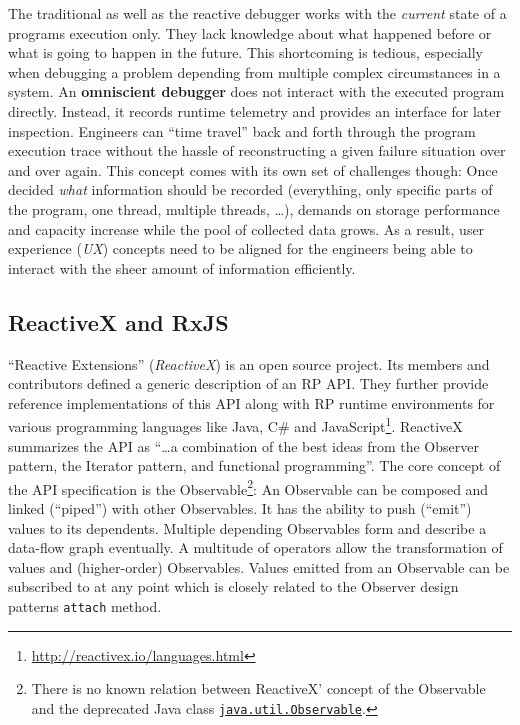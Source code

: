 \documentclass[12pt,a4paper]{article}
\begin{document}
The traditional as well as the reactive debugger works with the \emph{current} state of a programs execution only. They lack knowledge about what happened before or what is going to happen in the future. This shortcoming is tedious, especially when debugging a problem depending from multiple complex circumstances in a system. An \textbf{omniscient debugger} \cite{5287015} \cite{DBLP:journals/corr/OCallahanJFHNP17} does not interact with the executed program directly. Instead, it records runtime telemetry and provides an interface for later inspection. Engineers can ``time travel'' back and forth through the program execution trace without the hassle of reconstructing a given failure situation over and over again. This concept comes with its own set of challenges though: Once decided \emph{what} information should be recorded (everything, only specific parts of the program, one thread, multiple threads, \dots), demands on storage performance and capacity increase while the pool of collected data grows. As a result, user experience (\emph{UX}) concepts need to be aligned for the engineers being able to interact with the sheer amount\cite{5287015} of information efficiently.

\subsection{ReactiveX and RxJS}

``Reactive Extensions'' (\emph{ReactiveX}) is an open source project. Its members and contributors defined a generic description of an RP API. They further provide reference implementations of this API along with RP runtime environments for various programming languages like Java, C\# and JavaScript\footnote{\url{http://reactivex.io/languages.html}}. ReactiveX summarizes the API as ``\dots a combination of the best ideas from the Observer pattern, the Iterator pattern, and functional programming''\cite{reactivex}. The core concept of the API specification is the Observable\footnote{There is no known relation between ReactiveX' concept of the Observable and the deprecated Java class \href{https://docs.oracle.com/en/java/javase/11/docs/api/java.base/java/util/Observable.html}{\texttt{java.util.Observable}}.}: An Observable can be composed and linked (``piped'') with other Observables. It has the ability to push (``emit'') values to its dependents. Multiple depending Observables form and describe a data-flow graph eventually. A multitude of operators allow the transformation of values and (higher-order) Observables. Values emitted from an Observable can be subscribed to at any point which is closely related to the Observer design patterns \texttt{attach} method.
\end{document}
